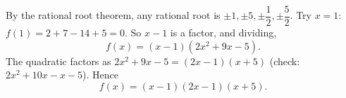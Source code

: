 By the rational root theorem, any rational root is $\pm1,\pm5,\pm\dfrac{1}{2},\pm\dfrac{5}{2}$. Try $x=1$: $f(1)=2+7-14+5=0$. So $x-1$ is a factor, and dividing,
\[
f(x)=(x-1)(2x^2+9x-5).
\]
The quadratic factors as $2x^2+9x-5=(2x-1)(x+5)$ (check: $2x^2+10x-x-5$). Hence
\[
f(x)=\boxed{(x-1)(2x-1)(x+5)} .
\]
